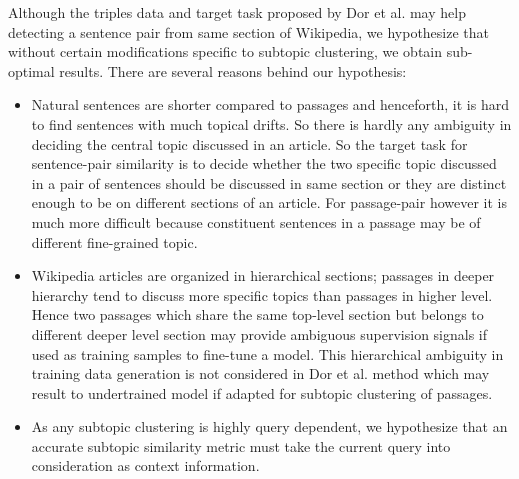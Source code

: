 \documentclass[sigconf,authordraft]{acmart}
\begin{document}
Although the triples data and target task proposed by Dor et al. may help detecting a sentence pair from same section of Wikipedia, we hypothesize that without certain modifications specific to subtopic clustering, we obtain sub-optimal results. There are several reasons behind our hypothesis: 
\begin{itemize}
    \item Natural sentences are shorter compared to passages and henceforth, it is hard to find sentences with much topical drifts. So there is hardly any ambiguity in deciding the central topic discussed in an article. So the target task for sentence-pair similarity is to decide whether the two specific topic discussed in a pair of sentences should be discussed in same section or they are distinct enough to be on different sections of an article. For passage-pair however it is much more difficult because constituent sentences in a passage may be of different fine-grained topic.
    \item Wikipedia articles are organized in hierarchical sections; passages in deeper hierarchy tend to discuss more specific topics than passages in higher level. Hence two passages which share the same top-level section but belongs to different deeper level section may provide ambiguous supervision signals if used as training samples to fine-tune a model. This hierarchical ambiguity in training data generation is not considered in Dor et al. method which may result to undertrained model if adapted for subtopic clustering of passages.
    \item As any subtopic clustering is highly query dependent, we hypothesize that an accurate subtopic similarity metric must take the current query into consideration as context information.
\end{itemize}
\end{document}
